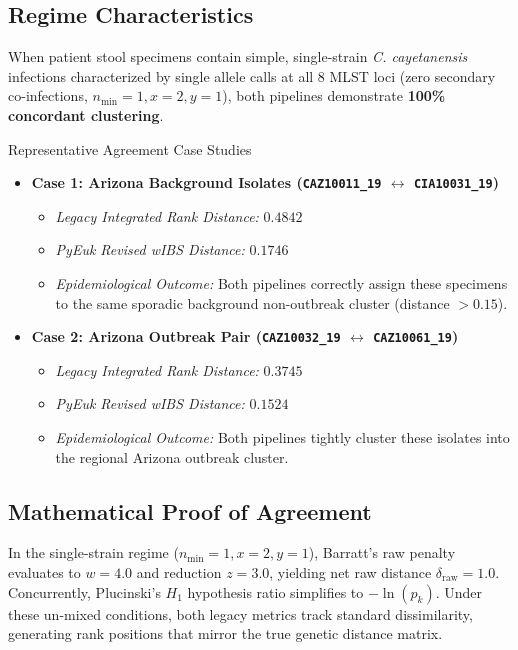 \documentclass[11pt,a4paper]{article}
\begin{document}
\subsection{Regime Characteristics}
When patient stool specimens contain simple, single-strain \textit{C. cayetanensis} infections characterized by single allele calls at all 8 MLST loci (zero secondary co-infections, $n_{\text{min}} = 1, x = 2, y = 1$), both pipelines demonstrate \textbf{100\% concordant clustering}.

\begin{successbox}{Representative Agreement Case Studies}
\begin{itemize}[leftmargin=*]
    \item \textbf{Case 1: Arizona Background Isolates (\texttt{CAZ10011\_19} $\leftrightarrow$ \texttt{CIA10031\_19})}
    \begin{itemize}
        \item \textit{Legacy Integrated Rank Distance:} $0.4842$
        \item \textit{PyEuk Revised wIBS Distance:} $0.1746$
        \item \textit{Epidemiological Outcome:} Both pipelines correctly assign these specimens to the same sporadic background non-outbreak cluster (distance $> 0.15$).
    \end{itemize}
    \item \textbf{Case 2: Arizona Outbreak Pair (\texttt{CAZ10032\_19} $\leftrightarrow$ \texttt{CAZ10061\_19})}
    \begin{itemize}
        \item \textit{Legacy Integrated Rank Distance:} $0.3745$
        \item \textit{PyEuk Revised wIBS Distance:} $0.1524$
        \item \textit{Epidemiological Outcome:} Both pipelines tightly cluster these isolates into the regional Arizona outbreak cluster.
    \end{itemize}
\end{itemize}
\end{successbox}

\subsection{Mathematical Proof of Agreement}
In the single-strain regime ($n_{\text{min}} = 1, x = 2, y = 1$), Barratt's raw penalty evaluates to $w = 4.0$ and reduction $z = 3.0$, yielding net raw distance $\delta_{\text{raw}} = 1.0$. Concurrently, Plucinski's $H_1$ hypothesis ratio simplifies to $-\ln(p_k)$. Under these un-mixed conditions, both legacy metrics track standard dissimilarity, generating rank positions that mirror the true genetic distance matrix.
\end{document}
